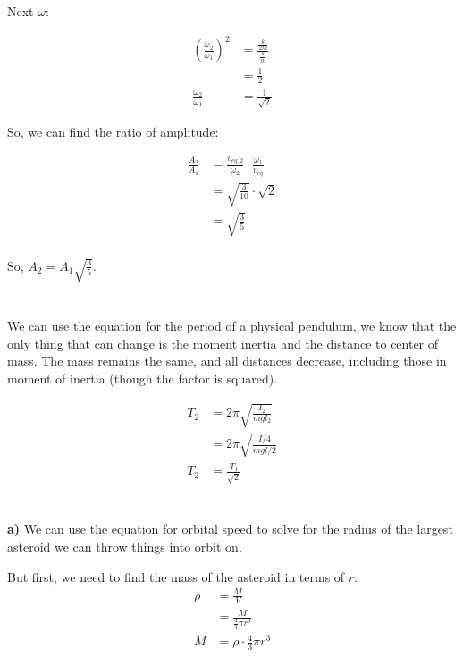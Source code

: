 \documentclass{article}
\begin{document}
Next $\omega$:

\begin{align*}
    \left(\frac{\omega_2}{\omega_1}\right)^2 &= \frac{\frac{k}{2m}}{\frac{k}{m}} \\
    &= \frac{1}{2} \\
    \frac{\omega_2}{\omega_1} &= \frac{1}{\sqrt{2}}
\end{align*}

So, we can find the ratio of amplitude:

\begin{align*}
    \frac{A_2}{A_1} &= \frac{v_{eq,2}}{\omega_2}\cdot\frac{\omega_1}{v_{eq}} \\
    &= \sqrt{\frac{3}{10}}\cdot\sqrt{2} \\
    &= \sqrt{\frac{3}{5}} \\
\end{align*}

So, $A_2 = A_1\sqrt{\frac{3}{5}}$.

\newpage
\section{}

We can use the equation for the period of a physical pendulum, we know that the only thing that can change is the moment inertia and the distance to center of mass. The mass remains the same, and all distances decrease, including those in moment of inertia (though the factor is squared).

\begin{align*}
    T_2 &= 2\pi\sqrt{\frac{I_2}{mgl_2}} \\
    &= 2\pi\sqrt{\frac{I/4}{mgl/2}} \\
    T_2 &= \frac{T_1}{\sqrt{2}}
\end{align*}

\newpage
\section{}

\textbf{a)} We can use the equation for orbital speed to solve for the radius of the largest asteroid we can throw things into orbit on.

But first, we need to find the mass of the asteroid in terms of $r$:
\begin{align*}
    \rho &= \frac{M}{V} \\
    &= \frac{M}{\frac{4}{3}\pi r^3} \\
    M &= \rho\cdot\frac{4}{3}\pi r^3 \\
\end{align*}
\end{document}
